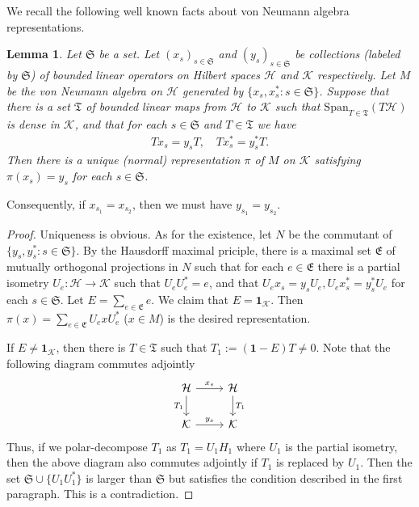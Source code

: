 \documentclass[11pt,b5paper,notitlepage]{article}
\theoremstyle{definition}
\theoremstyle{plain}
\newtheorem{lm}[df]{Lemma}
\newcommand{\fk}{\mathfrak}
\newcommand{\mc}{\mathcal}
\newcommand{\id}{\mathbf{1}}
\newcommand{\Span}{\mathrm{Span}}
\numberwithin{equation}{section}
\begin{document}
We recall the following well known facts about von Neumann algebra representations.
\begin{lm}\label{lb3}
Let $\fk S$ be a set. Let $(x_s)_{s\in\fk S}$ and $(y_s)_{s\in\fk S}$ be collections (labeled by $\fk S$) of bounded linear operators on Hilbert spaces $\mc H$ and $\mc K$ respectively. Let $M$ be the von Neumann algebra on $\mc H$ generated by $\{x_s,x_s^*:s\in \fk S\}$. Suppose that there is a set $\fk T$ of bounded  linear maps from $\mc H$ to $\mc K$ such that $\Span_{T\in\fk T}(T\mc H)$ is dense in $\mc K$, and that for each $s\in \fk S$ and $T\in\fk T$ we have
	\begin{align*}
		Tx_s=y_sT,\quad Tx_s^*=y_s^*T.	
	\end{align*}
	Then there is a unique  (normal) representation $\pi$ of $M$ on $\mc K$ satisfying $\pi(x_s)=y_s$ for each $s\in\fk S$.
\end{lm}

Consequently, if $x_{s_1}=x_{s_2}$, then we must have $y_{s_1}=y_{s_2}$.

\begin{proof}
	Uniqueness is obvious. As for the existence, let $N$ be the  commutant of $\{y_s,y_s^*:s\in\fk S\}$. By the Hausdorff maximal priciple, there is a maximal set $\fk E$ of mutually orthogonal projections in $N$ such that for each $e\in\fk E$ there is a partial isometry $U_e:\mc H\rightarrow\mc K$ such that $U_eU_e^*=e$, and that $U_ex_s=y_sU_e,U_ex_s^*=y_s^*U_e$ for each $s\in\fk S$.  Let $E=\sum_{e\in\fk E}e$. We claim that $E=\id_{\mc K}$. Then $\pi(x)=\sum_{e\in\fk E}U_exU_e^*$ ($x\in M$) is the desired representation. 
	
	If $E\neq \id_{\mc K}$, then there is $T\in\fk T$ such that $T_1:=(\id-E)T\neq 0$. Note that the following diagram commutes adjointly
	\begin{equation*}
		\begin{tikzcd}
			\mc H\arrow[r,"x_s"]\arrow[d,"T_1"']&\mc H\arrow[d,"T_1"]\\
			\mc K\arrow[r,"y_s"]&\mc K
		\end{tikzcd}	
	\end{equation*}
	Thus, if we polar-decompose $T_1$ as $T_1=U_1H_1$ where $U_1$ is the  partial isometry, then the above diagram also commutes adjointly if $T_1$ is replaced by $U_1$. Then the set $\fk S\cup\{U_1U_1^*\}$ is larger than $\fk S$ but satisfies the condition described in the first paragraph. This is a contradiction.
\end{proof}
\end{document}
